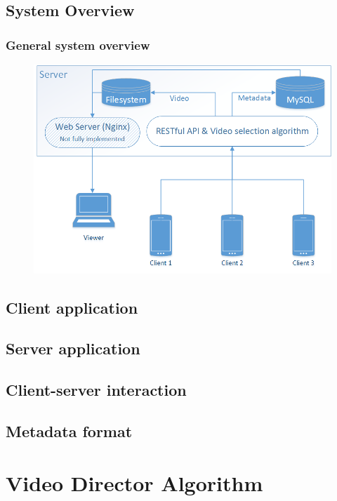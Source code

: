 \documentclass[10pt,pdf]{beamer}
\begin{document}
	\subsection{System Overview}
	\begin{frame}
		\frametitle{General system overview}
		\begin{figure}[!t]
			\centering
			\includegraphics[width=\textwidth,height=.9\textheight,keepaspectratio]{sys_arch.png}
			\label{fig:gen_arch}
		\end{figure}
	\end{frame}

	\subsection{Client application}
	

	\subsection{Server application}
	

	\subsection{Client-server interaction}
	

	\subsection{Metadata format}
	

\section{Video Director Algorithm}

	
\end{document}
